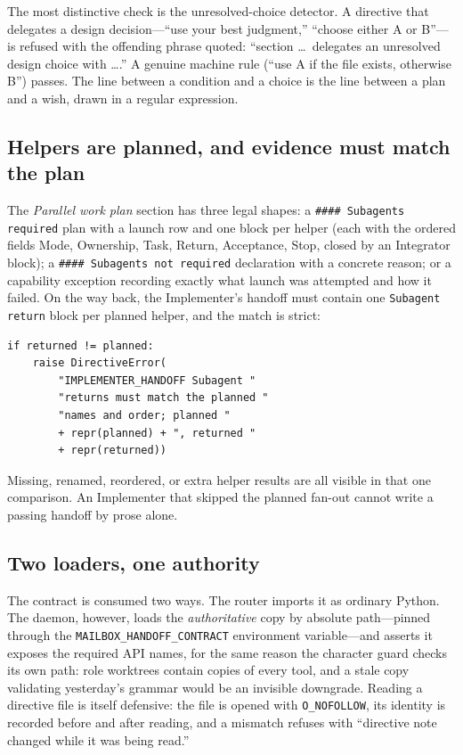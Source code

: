 \documentclass[10pt,aps,prd,twocolumn,nofootinbib]{revtex4-2}
\newcommand{\code}[1]{\texttt{#1}}
\begin{document}
The most distinctive check is the unresolved-choice detector.  A
directive that delegates a design decision---``use your best
judgment,'' ``choose either A or B''---is refused with the offending
phrase quoted: ``section \dots\ delegates an unresolved design choice
with \dots.''  A genuine machine rule (``use A if the file exists,
otherwise B'') passes.  The line between a condition and a choice is
the line between a plan and a wish, drawn in a regular expression.

\subsection{Helpers are planned, and evidence must match the plan}

The \emph{Parallel work plan} section has three legal shapes: a
\code{\#\#\#\# Subagents required} plan with a launch row and one
block per helper (each with the ordered fields Mode, Ownership, Task,
Return, Acceptance, Stop, closed by an Integrator block); a
\code{\#\#\#\# Subagents not required} declaration with a concrete
reason; or a capability exception recording exactly what launch was
attempted and how it failed.  On the way back, the Implementer's
handoff must contain one \code{Subagent return} block per planned
helper, and the match is strict:

\begin{verbatim}
if returned != planned:
    raise DirectiveError(
        "IMPLEMENTER_HANDOFF Subagent "
        "returns must match the planned "
        "names and order; planned "
        + repr(planned) + ", returned "
        + repr(returned))
\end{verbatim}

Missing, renamed, reordered, or extra helper results are all visible
in that one comparison.  An Implementer that skipped the planned
fan-out cannot write a passing handoff by prose alone.

\subsection{Two loaders, one authority}

The contract is consumed two ways.  The router imports it as ordinary
Python.  The daemon, however, loads the \emph{authoritative} copy by
absolute path---pinned through the \code{MAILBOX\_HANDOFF\_CONTRACT}
environment variable---and asserts it exposes the required API names,
for the same reason the character guard checks its own path: role
worktrees contain copies of every tool, and a stale copy validating
yesterday's grammar would be an invisible downgrade.  Reading a
directive file is itself defensive: the file is opened with
\code{O\_NOFOLLOW}, its identity is recorded before and after reading,
and a mismatch refuses with ``directive note changed while it was
being read.''
\end{document}
